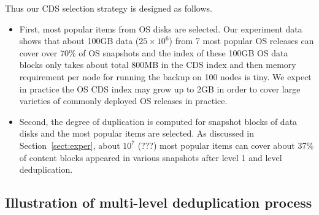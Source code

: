Thus our CDS selection strategy is designed as follows.
\begin{itemize}
\item First, most popular items from OS disks are selected.
Our experiment data shows that about 
100GB data ($25\times 10^6$\cite{BAD}) from 7 most popular OS releases
can cover over 70\% of OS snapshots and the index of these 100GB OS data blocks
only takes about total 800MB in the CDS index and then memory requirement per node for running the backup
on  100 nodes is tiny.
We expect in practice the OS CDS index may grow up to 2GB in order to cover large varieties  of commonly deployed
OS releases in practice.
\item Second, the degree of duplication is computed for snapshot blocks of data disks and
the  most popular items are selected. As discussed in Section~\ref{sect:exper}, 
about $10^7$ (???) most popular items
can cover about 37\% of content blocks appeared in various snapshots after level 1 and level deduplication.  
\end{itemize}


\subsection{Illustration  of multi-level deduplication process}




